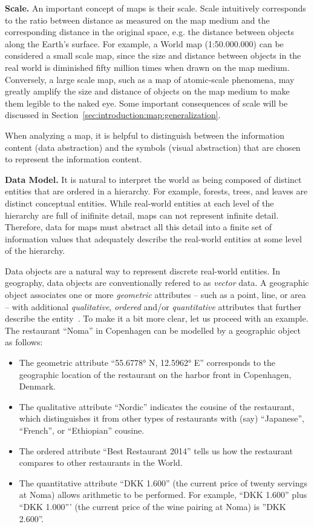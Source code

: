 \documentclass[11pt, oneside]{report}
\newcommand{\minisec}[1]{\noindent\textbf{#1.}}
\begin{document}
{\minisec{Scale}
An important concept of maps is their scale. Scale intuitively corresponds to the ratio between distance as measured on the map medium and the corresponding distance in the original space, e.g. the distance between objects along the Earth's surface. For example, a World map (1:50.000.000) can be considered a small scale map, since the size and distance between objects in the real world is diminished fifty million times when drawn on the map medium. Conversely, a large scale map, such as a map of atomic-scale phenomena, may greatly amplify the size and distance of objects on the map medium to make them legible to the naked eye. Some important consequences of scale will be discussed in Section~\ref{sec:introduction:map:generalization}.

When analyzing a map, it is helpful to distinguish between the information content (data abstraction) and the symbols (visual abstraction) that are chosen to represent the information content. 


\minisec{Data Model}
It is natural to interpret the world as being composed of distinct entities that are ordered in a hierarchy. For example, forests, trees, and leaves are distinct conceptual entities. While real-world entities at each level of the hierarchy are full of inifinite detail, maps can not represent infinite detail. Therefore, data for maps must abstract all this detail into a finite set of information values that adequately describe the real-world entities at some level of the hierarchy.

Data objects are a natural way to represent discrete real-world entities. In geography, data objects are conventionally refered to as \emph{vector} data. A geographic object associates one or more \emph{geometric} attributes -- such as a point, line, or area -- with additional \emph{qualitative}, \emph{ordered} and/or \emph{quantitative} attributes that further describe the entity~\cite{bertin1967semiologie}. To make it a bit more clear, let us proceed with an example. The restaurant ``Noma'' in Copenhagen can be modelled by a geographic object as follows:

\begin{itemize}
\item The geometric attribute ``\ang{55.6778} N, \ang{12.5962} E'' corresponds to the geographic location of the restaurant on the harbor front in Copenhagen, Denmark.
\item The qualitative attribute ``Nordic'' indicates the cousine of the restaurant, which distinguishes it from other types of restaurants with (say) ``Japanese'', ``French'', or ``Ethiopian'' cousine.
\item The ordered attribute ``Best Restaurant 2014'' tells us how the restaurant compares to other restaurants in the World. 
\item The quantitative attribute ``DKK 1.600'' (the current price of twenty servings at Noma) allows arithmetic to be performed. For example, ``DKK 1.600'' plus ``DKK 1.000''' (the current price of the wine pairing at Noma) is ''DKK 2.600''.
\end{itemize}

}
\end{document}
